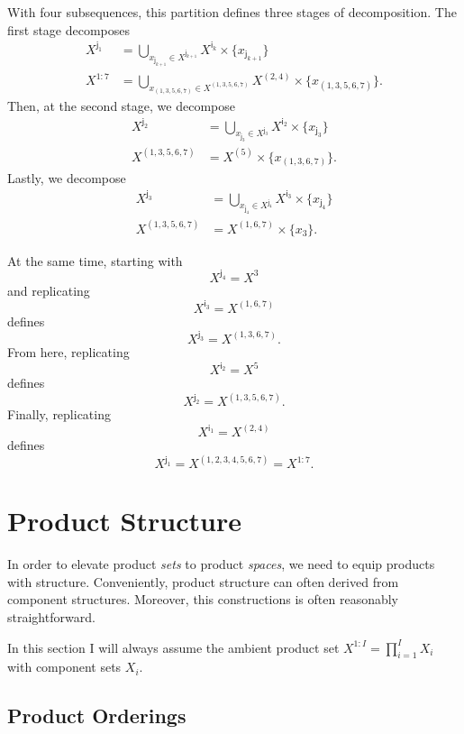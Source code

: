 \documentclass[
  letterpaper,
  DIV=11,
  numbers=noendperiod]{scrartcl}
\begin{document}
With four subsequences, this partition defines three stages of
decomposition. The first stage decomposes \begin{align*}
X^{ \mathsf{j}_{1} }
&=
\bigcup_{ x_{ \mathsf{j}_{k + 1} } \in X^{ \mathsf{j}_{k + 1} } }
X^{ \mathsf{i}_{k} } \times \{ x_{ \mathsf{j}_{k + 1} }  \}
\\
X^{1:7}
&=
\bigcup_{ x_{ ( 1, 3, 5, 6, 7 ) } \in X^{ ( 1, 3, 5, 6, 7 ) } }
X^{ (2, 4) } \times \{ x_{ ( 1, 3, 5, 6, 7 ) }  \}.
\end{align*} Then, at the second stage, we decompose \begin{align*}
X^{ \mathsf{j}_{2} }
&=
\bigcup_{ x_{ \mathsf{j}_{3} } \in X^{ \mathsf{j}_{3} } }
X^{ \mathsf{i}_{2} } \times \{ x_{ \mathsf{j}_{3} }  \}
\\
X^{(1, 3, 5, 6, 7)}
&=
X^{ (5) } \times \{ x_{ (1, 3, 6, 7) } \}.
\end{align*} Lastly, we decompose \begin{align*}
X^{ \mathsf{j}_{3} }
&=
\bigcup_{ x_{ \mathsf{j}_{4} } \in X^{ \mathsf{j}_{4} } }
X^{ \mathsf{i}_{3} } \times \{ x_{ \mathsf{j}_{4} }  \}
\\
X^{(1, 3, 5, 6, 7)}
&=
X^{ (1, 6, 7) } \times \{ x_{3} \}.
\end{align*}

At the same time, starting with \[
X^{ \mathsf{j}_{4} } = X^{ 3 }
\] and replicating \[
X^{ \mathsf{i}_{3} } = X^{ (1, 6, 7) }
\] defines \[
X^{ \mathsf{j}_{3} } = X^{ (1, 3, 6, 7) }.
\] From here, replicating \[
X^{ \mathsf{i}_{2} } = X^{ 5 }
\] defines \[
X^{ \mathsf{j}_{2} } = X^{ (1, 3, 5, 6, 7) }.
\] Finally, replicating \[
X^{ \mathsf{i}_{1} } = X^{ (2, 4) }
\] defines \[
X^{ \mathsf{j}_{1} } = X^{ (1, 2, 3, 4, 5, 6, 7) } = X^{1:7}.
\]

\section{Product Structure}\label{product-structure}

In order to elevate product \emph{sets} to product \emph{spaces}, we
need to equip products with structure. Conveniently, product structure
can often derived from component structures. Moreover, this
constructions is often reasonably straightforward.

In this section I will always assume the ambient product set
\(X^{1:I} = \prod_{i = 1}^{I} X_{i}\) with component sets \(X_{i}\).

\subsection{Product Orderings}\label{product-orderings}
\end{document}
